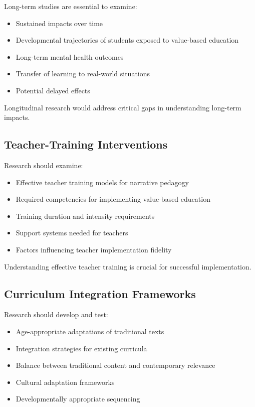 \documentclass[12pt,a4paper,twocolumn]{article}
\begin{document}
Long-term studies are essential to examine:
\begin{itemize}
    \item Sustained impacts over time
    \item Developmental trajectories of students exposed to value-based education
    \item Long-term mental health outcomes
    \item Transfer of learning to real-world situations
    \item Potential delayed effects
\end{itemize}

Longitudinal research would address critical gaps in understanding long-term impacts.

\subsection{Teacher-Training Interventions}

Research should examine:
\begin{itemize}
    \item Effective teacher training models for narrative pedagogy
    \item Required competencies for implementing value-based education
    \item Training duration and intensity requirements
    \item Support systems needed for teachers
    \item Factors influencing teacher implementation fidelity
\end{itemize}

Understanding effective teacher training is crucial for successful implementation.

\subsection{Curriculum Integration Frameworks}

Research should develop and test:
\begin{itemize}
    \item Age-appropriate adaptations of traditional texts
    \item Integration strategies for existing curricula
    \item Balance between traditional content and contemporary relevance
    \item Cultural adaptation frameworks
    \item Developmentally appropriate sequencing
\end{itemize}
\end{document}
